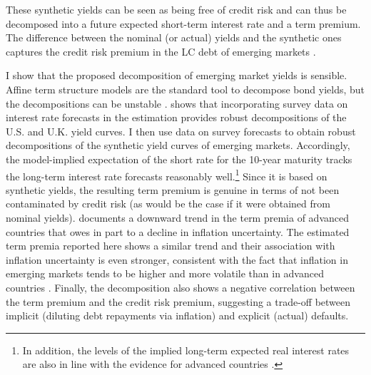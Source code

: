 {%
These synthetic yields can be seen as being free of credit risk and 
can thus be decomposed into a 
future expected short-term interest rate and a term premium.
The difference between the nominal (or actual) yields and the synthetic ones captures the credit risk premium in the LC debt of emerging markets \citep{DuSchreger:2016JoF}.

I show that the proposed decomposition of emerging market yields is sensible.
Affine term structure models are the standard tool to decompose bond yields, but the decompositions can be unstable \citep{Cochrane:2007}.
\cite{Guimaraes:2014} shows that incorporating survey data on interest rate forecasts in the estimation provides robust decompositions of the U.S. and U.K. yield curves.
I then use data on survey forecasts to obtain robust decompositions of the synthetic yield curves of emerging markets.
Accordingly, the model-implied expectation of the short rate for the 10-year maturity tracks the long-term interest rate forecasts reasonably well.\footnote{ In addition, the levels of the implied long-term expected real interest rates are also in line with the evidence for advanced countries \citep*{HolstonLaubachWilliams:2017}.}
Since it is based on synthetic yields, the resulting term premium is genuine in terms of not been contaminated by credit risk (as would be the case if it were obtained from nominal yields).
\cite{Wright:2011} documents a downward trend in the term premia of advanced countries that owes in part to a decline in inflation uncertainty.
The estimated term premia reported here shows a similar trend and their association with inflation uncertainty is even stronger, consistent with the fact that inflation in emerging markets tends to be higher and more volatile than in advanced countries \citep{HaKoseOhnsorge:2019}.
Finally, the decomposition also shows a negative correlation between the term premium and the credit risk premium, suggesting a trade-off between implicit (diluting debt repayments via inflation) and explicit (actual) defaults.

}
